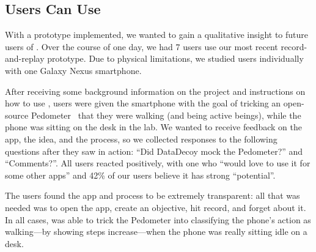 \subsection{Users Can Use \PocketMocker{}}
\label{subsec-usability}


With a  prototype implemented, we wanted to gain a qualitative insight to
future users of \PocketMocker{}. Over the course of one day, we had 7 users use
our most recent record-and-replay prototype. Due to physical limitations, we
studied users individually with one Galaxy Nexus smartphone. 

After receiving some background information on the project and instructions
on how to use \PocketMocker{}, users were given the smartphone with the goal
of tricking an open-source Pedometer~\cite{pedometer-playstore-url} that they
were walking (and being active beings), while the phone was sitting on the
desk in the lab. We wanted to receive feedback on the app, the idea,
and the process, so we collected responses to the following questions after
they saw \PocketMocker{} in action: ``Did DataDecoy mock the Pedometer?'' and
``Comments?''. All users reacted positively, with one who ``would love to use
it for some other apps'' and 42\% of our users believe it has strong
``potential''. 

The users found the app and process to be extremely transparent: all
that was needed was to open the app, create an objective, hit record, and
forget about it. In all cases, \PocketMocker{} was able to trick the
Pedometer into classifying the phone's action as walking---by showing steps
increase---when the phone was really sitting idle on a desk.
